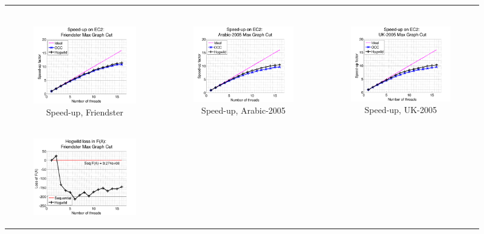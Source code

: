 \begin{figure}[ht]
\begin{tabular}{ccc}
\begin{subfigure}[b]{0.31\textwidth}
	  \end{subfigure} \\
	  \begin{subfigure}[b]{0.31\textwidth}
	  	\includegraphics[width=150pt]{images/speedup_friendster10M_maxgraphcut.png}
			\caption{Speed-up, Friendster}
			\label{appfig:speedup_friendster10M_maxgraphcut}
	  \end{subfigure} &
	  \begin{subfigure}[b]{0.31\textwidth}
	  	\includegraphics[width=150pt]{images/speedup_arabic2005_maxgraphcut.png}
			\caption{Speed-up, Arabic-2005}
			\label{appfig:speedup_arabic2005_maxgraphcut}
	  \end{subfigure} &
	  \begin{subfigure}[b]{0.31\textwidth}
	  	\includegraphics[width=150pt]{images/speedup_uk2005_maxgraphcut.png}
			\caption{Speed-up, UK-2005}
			\label{appfig:speedup_uk2005_maxgraphcut}
	  \end{subfigure} \\
	  \begin{subfigure}[b]{0.31\textwidth}
	  	\includegraphics[width=150pt]{images/diffFA_Hogwild_friendster10M_maxgraphcut.png}

\end{subfigure}
\end{tabular}
\end{figure}
